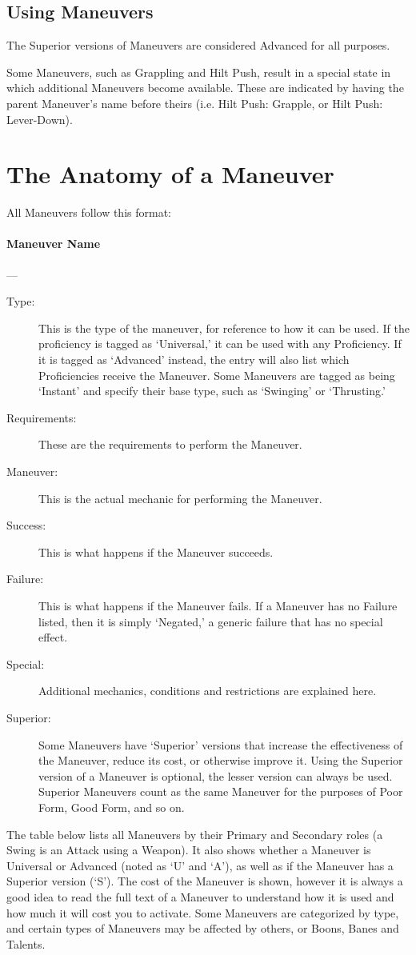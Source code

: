 \documentclass[oneside,11pt,english]{book}
\begin{document}
\subsection{Using Maneuvers}
The Superior versions of Maneuvers are considered Advanced for all purposes.

Some Maneuvers, such as Grappling and Hilt Push, result in a special state in
which additional Maneuvers become available. These are indicated by having the
parent Maneuver’s name before theirs (i.e. Hilt Push: Grapple, or Hilt Push:
Lever-Down). 

\section{\label{sec:Maneuvers}The Anatomy of a Maneuver}
All Maneuvers follow this format:

\paragraph{\large Maneuver Name}---
\vspace{-10pt}\begin{description}
\item [Type:] This is the type of the maneuver, for reference to how it can be
  used. If the proficiency is tagged as ‘Universal,’ it can be used with any
  Proficiency. If it is tagged as ‘Advanced’ instead, the entry will also list
  which Proficiencies receive the Maneuver. Some Maneuvers are tagged as being
  ‘Instant’ and specify their base type, such as ‘Swinging’ or ‘Thrusting.’ 
\item [Requirements:] These are the requirements to perform the Maneuver.
\item [Maneuver:] This is the actual mechanic for performing the Maneuver.
\item [Success:] This is what happens if the Maneuver succeeds.
\item [Failure:] This is what happens if the Maneuver fails. If a Maneuver has no Failure listed, then it is simply ‘Negated,’ a generic failure that has no special effect.
\item [Special:] Additional mechanics, conditions and restrictions are explained here.
\item [Superior:] Some Maneuvers have ‘Superior’ versions that increase the
  effectiveness of the Maneuver, reduce its cost, or otherwise improve it. Using
  the Superior version of a Maneuver is optional, the lesser version can always
  be used. Superior Maneuvers count as the same Maneuver for the purposes of
  Poor Form, Good Form, and so on. 
\end{description}
The table below lists all Maneuvers by their Primary and Secondary roles (a Swing is an Attack using a 
Weapon). It also shows whether a Maneuver is Universal or Advanced (noted as ‘U’ and ‘A’), as well as 
if the Maneuver has a Superior version (‘S’). The cost of the Maneuver is shown, however it is always a 
good idea to read the full text of a Maneuver to understand how it is used and how much it will cost you 
to activate. Some Maneuvers are categorized by type, and certain types of Maneuvers may be affected by 
others, or Boons, Banes and Talents.
\end{document}
